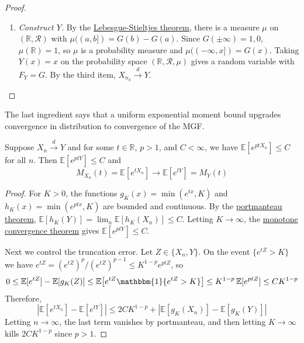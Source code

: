\begin{proof}
\begin{enumerate}
		\item \textit{Construct $Y$.} By the \hyperref[mt-thm:lebesgue-stieltjes-measures]{Lebesgue-Stieltjes theorem}, there is a measure $\mu$ on $(\mathbb{R}, \mathcal{R})$ with $\mu((a, b]) = G(b) - G(a)$. Since $G(\pm \infty) = 1, 0$, $\mu(\mathbb{R}) = 1$, so $\mu$ is a probability measure and $\mu((-\infty, x]) = G(x)$. Taking $Y(x) = x$ on the probability space $(\mathbb{R}, \mathcal{R}, \mu)$ gives a random variable with $F_Y = G$. By the third item, $X_{n_k} \xrightarrow{d} Y$. 
		\end{enumerate}
	\end{proof}

	The last ingredient says that a uniform exponential moment bound upgrades convergence in distribution to convergence of the MGF. 

	\begin{lemma}
	  \label{thm:truncation-lemma}
		Suppose $X_n \xrightarrow{d} Y$ and for some $t \in \mathbb{R}$, $p > 1$, and $C < \infty$, we have $\mathbb{E}[e^{p t X_n}] \leq C$ for all $n$. Then $\mathbb{E}[e^{p t Y}] \leq C$ and 
		\begin{equation}
			M_{X_n} (t) = \mathbb{E}[e^{t X_n}] \to \mathbb{E}[e^{t Y}] = M_Y (t)
		\end{equation}
	\end{lemma}
	\begin{proof}
		For $K > 0$, the functions $g_K (x) = \min(e^{t x}, K)$ and $h_K (x) = \min(e^{p t x}, K)$ are bounded and continuous. By the \hyperref[thm:portmanteau-theorem]{portmanteau theorem}, $\mathbb{E}[h_K (Y)] = \lim_n \mathbb{E}[h_K (X_n)] \leq C$. Letting $K \to \infty$, the \hyperref[mt-thm:monotone-convergene-theorem-mct]{monotone convergence theorem} gives $\mathbb{E}[e^{p t Y}] \leq C$. 

		Next we control the truncation error. Let $Z \in \{X_n, Y\}$. On the event $\{e^{t Z} > K\}$ we have $e^{t Z} = (e^{t Z})^p / (e^{t Z})^{p - 1} \leq K^{1 - p} e^{p t Z}$, so 
		\begin{equation}
			0 \leq \mathbb{E}[e^{t Z}] - \mathbb{E}[g_K (Z)] \leq \mathbb{E}\big[ e^{t Z} \mathbbm{1}\{e^{t Z} > K\} \big] \leq K^{1 - p} \, \mathbb{E}[e^{p t Z}] \leq C K^{1 - p}
		\end{equation}
		Therefore, 
		\begin{equation}
			|\mathbb{E}[e^{t X_n}] - \mathbb{E}[e^{t Y}]| \leq 2 C K^{1 - p} + |\mathbb{E}[g_K (X_n)] - \mathbb{E}[g_K (Y)]|
		\end{equation}
		Letting $n \to \infty$, the last term vanishes by portmanteau, and then letting $K \to \infty$ kills $2 C K^{1 - p}$ since $p > 1$. 
	\end{proof}

